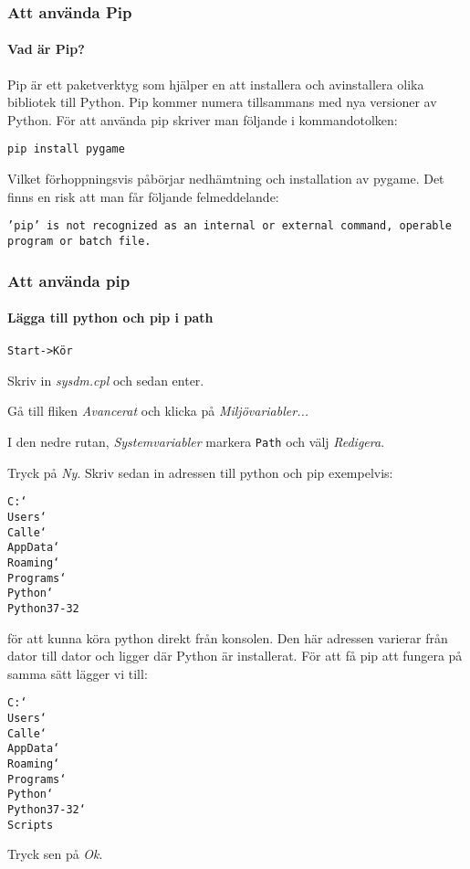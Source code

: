 \documentclass{beamer}
\begin{document}
\begin{frame}
\frametitle{Att använda Pip}
\framesubtitle{Vad är Pip?}

Pip är ett paketverktyg som hjälper en att installera och avinstallera olika bibliotek till Python. Pip kommer numera tillsammans med nya versioner av Python.
\pause
För att använda pip skriver man följande i kommandotolken:

\texttt{pip install pygame}

Vilket förhoppningsvis påbörjar nedhämtning och installation av pygame.
\pause
Det finns en risk att man får följande felmeddelande:

\texttt{'pip' is not recognized as an internal or external command, operable program or batch file.}


\end{frame}

\begin{frame}
\frametitle{Att använda pip}
\framesubtitle{Lägga till python och pip i path}

\texttt{Start->Kör}

Skriv in \textit{sysdm.cpl} och sedan enter. \pause

Gå till fliken \textit{Avancerat} och klicka på \textit{Miljövariabler...}

I den nedre rutan, \textit{Systemvariabler} markera \texttt{Path} och välj \textit{Redigera}. \pause

Tryck på \textit{Ny}. Skriv sedan in adressen till python och pip exempelvis:

\texttt{C:\char`\\Users\char`\\Calle\char`\\AppData\char`\\Roaming\char`\\Programs\char`\\}
\texttt{Python\char`\\Python37-32}

för att kunna köra python direkt från konsolen. \pause Den här adressen varierar från dator till dator och ligger där Python är installerat. För att få pip att fungera på samma sätt lägger vi till:

\texttt{C:\char`\\Users\char`\\Calle\char`\\AppData\char`\\Roaming\char`\\Programs\char`\\}
\texttt{Python\char`\\Python37-32\char`\\Scripts}

Tryck sen på \textit{Ok}.

\end{frame}
\end{document}
